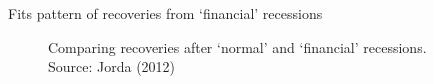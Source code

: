 \begin{frame}{Fits pattern of recoveries from `financial' recessions}

\begin{figure}
\begin{center}


\caption{Comparing recoveries after `normal' and `financial' recessions. Source: Jorda (2012)}

\end{center}
\end{figure}

\end{frame}



